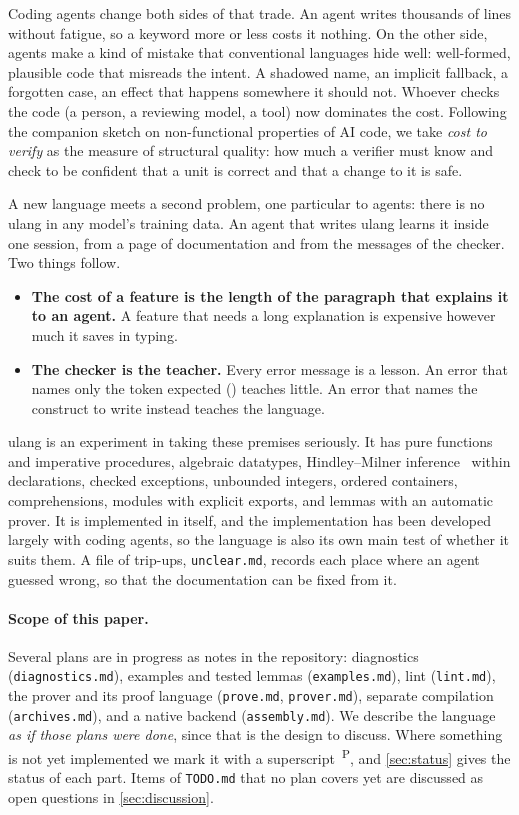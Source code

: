 \documentclass[11pt,a4paper]{article}
\newcommand{\code}[1]{\texttt{\detokenize{#1}}}
\newcommand{\file}[1]{\texttt{#1}}
\newcommand{\planned}{\textsuperscript{\textsf{\scriptsize P}}}
\begin{document}
Coding agents change both sides of that trade. An agent writes thousands of lines without
fatigue, so a keyword more or less costs it nothing. On the other side, agents make a kind
of mistake that conventional languages hide well: well-formed, plausible code that misreads
the intent. A shadowed name, an implicit fallback, a forgotten case, an effect that happens
somewhere it should not. Whoever checks the code (a person, a reviewing model, a tool) now
dominates the cost. Following the companion sketch on non-functional properties of AI code,
we take \emph{cost to verify} as the measure of structural quality: how much a verifier must
know and check to be confident that a unit is correct and that a change to it is
safe.

A new language meets a second problem, one particular to agents: there is no ulang in any
model's training data. An agent that writes ulang learns it inside one session, from a page
of documentation and from the messages of the checker. Two things follow.
\begin{itemize}
\item \textbf{The cost of a feature is the length of the paragraph that explains it to an agent.}
  A feature that needs a long explanation is expensive however much it saves in typing.
\item \textbf{The checker is the teacher.} Every error message is a lesson. An error that
  names only the token expected (\code{end expected but x found}) teaches little. An error
  that names the construct to write instead teaches the language.
\end{itemize}

ulang is an experiment in taking these premises seriously. It has pure functions and
imperative procedures, algebraic datatypes, Hindley--Milner inference~\cite{milner1978}
within declarations, checked exceptions, unbounded integers, ordered containers,
comprehensions, modules with explicit exports, and lemmas with an automatic prover. It is
implemented in itself, and the implementation has been developed largely with coding agents,
so the language is also its own main test of whether it suits them. A file of trip-ups,
\file{unclear.md}, records each place where an agent guessed wrong, so that the documentation
can be fixed from it.

\paragraph{Scope of this paper.}
Several plans are in progress as notes in the repository: diagnostics (\file{diagnostics.md}),
examples and tested lemmas (\file{examples.md}), lint (\file{lint.md}), the prover and its
proof language (\file{prove.md}, \file{prover.md}), separate compilation
(\file{archives.md}), and a native backend (\file{assembly.md}). We describe the language
\emph{as if those plans were done}, since that is the design to discuss. Where something is
not yet implemented we mark it with a superscript~\planned, and \cref{sec:status} gives the
status of each part. Items of \file{TODO.md} that no plan covers yet are discussed as open
questions in \cref{sec:discussion}.
\end{document}
